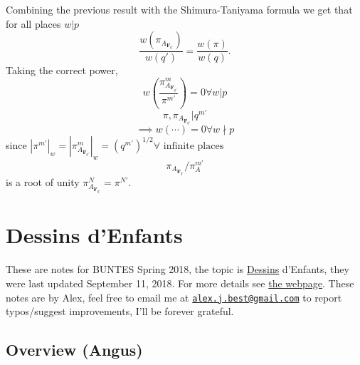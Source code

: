 \documentclass[10pt,]{book}
\numberwithin{equation}{section}
\newcommand{\FF}{\mathbf{F}}
\begin{document}
\hypertarget{p-455}{}%
Combining the previous result with the Shimura-Taniyama formula we get that for all places \(w|p\)%
\begin{equation*}
\frac{w(\pi_{A_{\FF_{q'}}})}{w(q')} = \frac{w(\pi)}{w(q)}\text{.}
\end{equation*}
Taking the correct power,%
\begin{equation*}
w\left( \frac {\pi^m_{A_{\FF_{q'}}}}{\pi^{m'}}\right) = 0 \forall w|p
\end{equation*}
%
\begin{equation*}
\pi,\pi_{A_{\FF_{q'}}}|q^{m'}
\end{equation*}
%
\begin{equation*}
\implies w(\cdots) = 0 \forall w \nmid p
\end{equation*}
since \(|\pi^{m'}|_w = |\pi_{A_{\FF_{q'}}}^m|_w = (q^{m'})^{1/2} \forall \text{ infinite places}\)%
\begin{equation*}
\pi_{A_{\FF_{q'}}}/ \pi_A^{m'}
\end{equation*}
is a root of unity \(\pi^N_{A_{\FF_{q'}}} = \pi^{N'}\).%
%
%
\typeout{************************************************}
\typeout{************************************************}
%
\chapter[{Dessins d'Enfants}]{Dessins d'Enfants}\label{chapter-dessins}
\hypertarget{p-456}{}%
These are notes for BUNTES Spring 2018, the topic is \hyperref[def-dessin-denfant]{Dessins} d'Enfants, they were last updated September 11, 2018. For more details see \href{http://math.bu.edu/people/angusmca/buntes/spring2018.html}{the webpage}. These notes are by Alex, feel free to email me at \href{mailto:alex.j.best@gmail.com}{\nolinkurl{alex.j.best@gmail.com}} to report typos/suggest improvements, I'll be forever grateful.%
%
%
\typeout{************************************************}
\typeout{************************************************}
%
\section[{Overview (Angus)}]{Overview (Angus)}\label{sec-dessins-overview}
%
%
\typeout{************************************************}
\typeout{************************************************}
%
\end{document}
